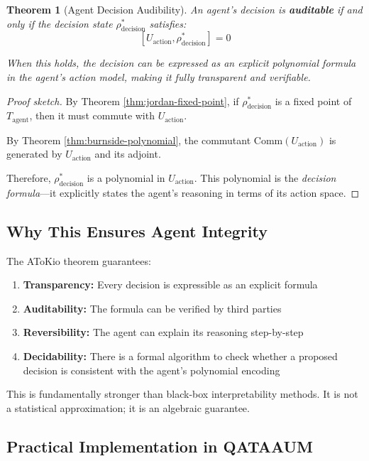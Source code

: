 \documentclass[11pt,a4paper]{article}
\theoremstyle{plain}
\newtheorem{theorem}{Theorem}[section]
\theoremstyle{definition}
\newcommand{\Com}[1]{\mathrm{Comm}(#1)}
\begin{document}
\begin{theorem}[Agent Decision Audibility]
\label{thm:atokio-audible}
An agent's decision is \textbf{auditable} if and only if the decision state $\rho^*_{\text{decision}}$ satisfies:
$$[U_{\text{action}}, \rho^*_{\text{decision}}] = 0$$

When this holds, the decision can be expressed as an explicit polynomial formula in the agent's action model, making it fully transparent and verifiable.
\end{theorem}

\begin{proof}[Proof sketch]
By Theorem \ref{thm:jordan-fixed-point}, if $\rho^*_{\text{decision}}$ is a fixed point of $T_{\text{agent}}$, then it must commute with $U_{\text{action}}$.

By Theorem \ref{thm:burnside-polynomial}, the commutant $\Com{U_{\text{action}}}$ is generated by $U_{\text{action}}$ and its adjoint.

Therefore, $\rho^*_{\text{decision}}$ is a polynomial in $U_{\text{action}}$. This polynomial is the \textit{decision formula}—it explicitly states the agent's reasoning in terms of its action space.
\end{proof}

\subsection{Why This Ensures Agent Integrity}

The AToKio theorem guarantees:

\begin{enumerate}
\item \textbf{Transparency:} Every decision is expressible as an explicit formula
\item \textbf{Auditability:} The formula can be verified by third parties
\item \textbf{Reversibility:} The agent can explain its reasoning step-by-step
\item \textbf{Decidability:} There is a formal algorithm to check whether a proposed decision is consistent with the agent's polynomial encoding
\end{enumerate}

This is fundamentally stronger than black-box interpretability methods. It is not a statistical approximation; it is an algebraic guarantee.

\subsection{Practical Implementation in QATAAUM}
\end{document}
